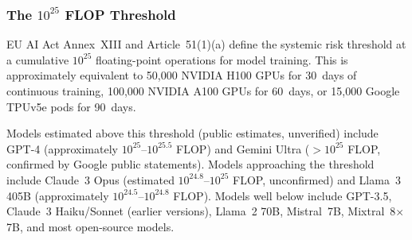 \documentclass[11pt,a4paper]{article}
\begin{document}
\subsubsection{The $10^{25}$ FLOP Threshold}

EU AI Act Annex~XIII and Article~51(1)(a) define the systemic risk threshold at a cumulative $10^{25}$ floating-point operations for model training. This is approximately equivalent to 50,000 NVIDIA H100 GPUs for 30~days of continuous training, 100,000 NVIDIA A100 GPUs for 60~days, or 15,000 Google TPUv5e pods for 90~days.

Models estimated above this threshold (public estimates, unverified) include GPT-4 (approximately $10^{25}$--$10^{25.5}$ FLOP) and Gemini Ultra ($>10^{25}$ FLOP, confirmed by Google public statements). Models approaching the threshold include Claude~3 Opus (estimated $10^{24.8}$--$10^{25}$ FLOP, unconfirmed) and Llama~3 405B (approximately $10^{24.5}$--$10^{24.8}$ FLOP). Models well below include GPT-3.5, Claude~3 Haiku/Sonnet (earlier versions), Llama~2 70B, Mistral~7B, Mixtral~8$\times$7B, and most open-source models.
\end{document}
